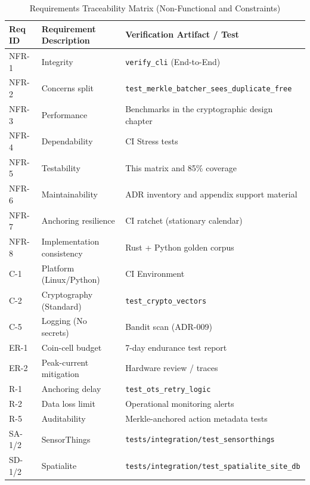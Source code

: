 \begin{table}[H]
\centering
\small
\caption{Requirements Traceability Matrix (Non-Functional and Constraints)}
\label{tab:req-traceability-non-fun}
\begin{tabularx}{\textwidth}{|l|>{\raggedright\arraybackslash}X|l|}
\hline
\textbf{Req ID} & \textbf{Requirement Description} & \textbf{Verification Artifact / Test} \\ \hline
NFR-1 & Integrity                      & \texttt{verify\_cli} (End-to-End) \\ \hline
NFR-2 & Concerns split                 & \texttt{test\_merkle\_batcher\_sees\_duplicate\_free} \\ \hline
NFR-3 & Performance                    & Benchmarks in the cryptographic design chapter \\ \hline
NFR-4 & Dependability                  & \ac{CI} Stress tests \\ \hline
NFR-5 & Testability                    & This matrix and 85\% coverage \\ \hline
NFR-6 & Maintainability                & \ac{ADR} inventory and appendix support material \\ \hline
NFR-7 & Anchoring resilience           & \ac{CI} ratchet (stationary calendar) \\ \hline
NFR-8 & Implementation consistency      & Rust + Python golden corpus \\ \hline
C-1   & Platform (Linux/Python)        & \ac{CI} Environment \\ \hline
C-2   & Cryptography (Standard)        & \texttt{test\_crypto\_vectors} \\ \hline
C-5   & Logging (No secrets)           & Bandit scan (\ac{ADR}-009) \\ \hline
ER-1  & Coin-cell budget               & 7-day endurance test report \\ \hline
ER-2  & Peak-current mitigation        & Hardware review / traces \\ \hline
R-1   & Anchoring delay                & \texttt{test\_ots\_retry\_logic} \\ \hline
R-2   & Data loss limit                & Operational monitoring alerts \\ \hline
R-5   & Auditability                   & Merkle-anchored action metadata tests \\ \hline
SA-1/2& SensorThings                   & \texttt{tests/integration/test\_sensorthings} \\ \hline
SD-1/2& Spatialite                     & \texttt{tests/integration/test\_spatialite\_site\_db} \\ \hline
\end{tabularx}
\end{table}

